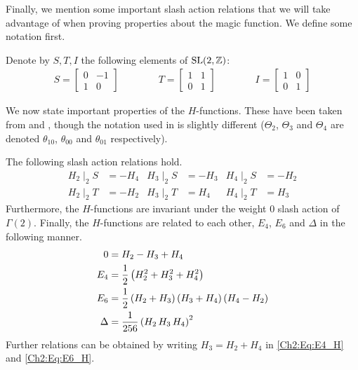 Finally, we mention some important slash action relations that we will take advantage of when proving properties about the magic function. We define some notation first.

\begin{boxnotation}
    Denote by $S, T, I$ the following elements of $\operatorname{SL}\!\left( 2, \mathbb{Z} \right)$:
    \begin{align*}
        S = \begin{bmatrix}
            0 & -1 \\ 1 & 0
        \end{bmatrix}
        \qquad \qquad
        T = \begin{bmatrix}
            1 & 1 \\ 0 & 1
        \end{bmatrix}
        \qquad \qquad
        I = \begin{bmatrix}
            1 & 0 \\ 0 & 1
        \end{bmatrix}
    \end{align*}
\end{boxnotation}

We now state important properties of the $H$-functions. These have been taken from \cite[(13)-(19)]{Viazovska8} and \cite[\S 6]{blueprint}, though the notation used in \cite{Viazovska8} is slightly different ($\Theta_2$, $\Theta_3$ and $\Theta_4$ are denoted $\theta_{10}$, $\theta_{00}$ and $\theta_{01}$ respectively).

\begin{boxproposition}\label{Ch2:Prop:H_Rels}
    The following slash action relations hold.
    \begin{align*}
        H_2 \mid_2 S &= -H_4
        &
        H_3 \mid_2 S &= -H_3
        &
        H_4 \mid_2 S &= -H_2
        \\
        H_2 \mid_2 T &= -H_2
        &
        H_3 \mid_2 T &= H_4
        &
        H_4 \mid_2 T &= H_3
    \end{align*}
    Furthermore, the $H$-functions are invariant under the weight $0$ slash action of $\Gamma(2)$. Finally, the $H$-functions are related to each other, $E_4$, $E_6$ and $\Delta$ in the following manner.
    \begin{align}
        0 &= H_2 - H_3 + H_4 \label{Ch2:Eq:H_Jacobi} \\
        E_4 &= \frac{1}{2} \left( H_2^2 + H_3^2 + H_4^2 \right) \label{Ch2:Eq:E4_H} \\
        E_6 &= \frac{1}{2} \left( H_2 + H_3 \right)\left( H_3 + H_4 \right)\left( H_4 - H_2 \right) \label{Ch2:Eq:E6_H} \\
        \Delta &= \frac{1}{256} \left( H_2 \, H_3 \, H_4 \right)^2 \label{Ch2:Eq:Disc_H}
    \end{align}
    Further relations can be obtained by writing $H_3 = H_2 + H_4$ in \eqref{Ch2:Eq:E4_H} and \eqref{Ch2:Eq:E6_H}.
\end{boxproposition}


